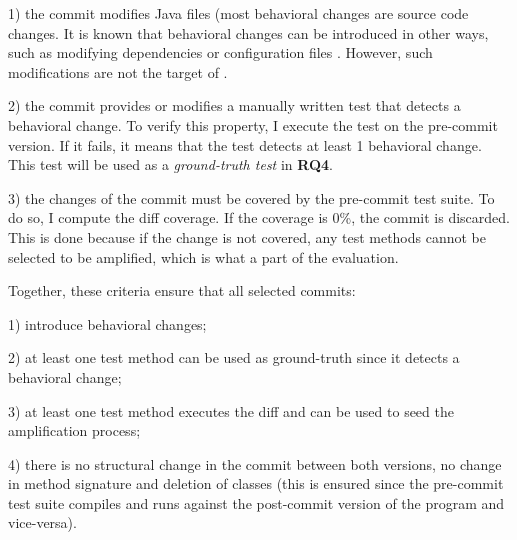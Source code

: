 1) the commit modifies Java files (most behavioral changes are source code changes.
It is known that behavioral changes can be introduced in other ways, such as modifying dependencies or configuration files \cite{Test:Coverage:Evolution}.
However, such modifications are not the target of \DCI.

2) the commit provides or modifies a manually written test that detects a behavioral change. 
To verify this property, I execute the test on the pre-commit version. 
If it fails, it means that the test detects at least 1 behavioral change.
This test will be used as a \textit{ground-truth test} in \textbf{RQ4}.

3) the changes of the commit must be covered by the pre-commit test suite.
To do so, I compute the diff coverage. 
If the coverage is 0\%, the commit is discarded. 
This is done because if the change is not covered, any test methods cannot be selected to be amplified, which is what a part of the evaluation.

Together, these criteria ensure that all selected commits:

1) introduce behavioral changes;

2) at least one test method can be used as ground-truth since it detects a behavioral change;

3) at least one test method executes the diff and can be used to seed the amplification process;

4) there is no structural change in the commit between both versions, \eg no change in method signature and deletion of classes (this is ensured since the pre-commit test suite compiles and runs against the post-commit version of the program and vice-versa).

